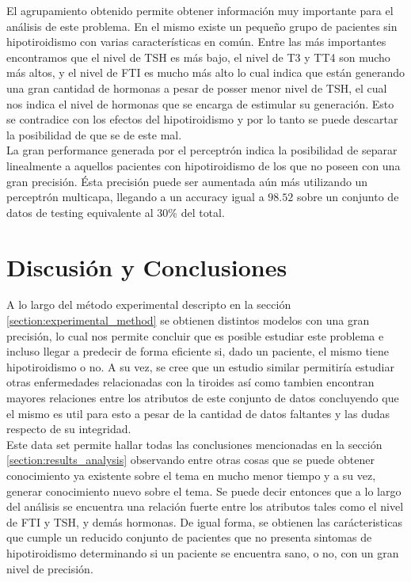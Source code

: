 \documentclass[osajnl,twocolumn,showpacs,superscriptaddress,10pt,floatfix]{revtex4-1} %
\begin{document}
El agrupamiento obtenido permite obtener información muy importante para el análisis de este problema. En el mismo existe un pequeño grupo de pacientes sin hipotiroidismo con varias características en común. Entre las más importantes encontramos que el nivel de TSH es más bajo, el nivel de T3 y TT4 son mucho más altos, y el nivel de FTI es mucho más alto lo cual indica que están generando una gran cantidad de hormonas a pesar de posser menor nivel de TSH, el cual nos indica el nivel de hormonas que se encarga de estimular su generación. Esto se contradice con los efectos del hipotiroidismo y por lo tanto se puede descartar la posibilidad de que se de este mal. \\

La gran performance generada por el perceptrón indica la posibilidad de separar linealmente a aquellos pacientes con hipotiroidismo de los que no poseen con una gran precisión. Ésta precisión puede ser aumentada aún más utilizando un perceptrón multicapa, llegando a un accuracy igual a $98.52$ sobre un conjunto de datos de testing equivalente al 30\% del total. \\


\section{Discusión y Conclusiones}

A lo largo del método experimental descripto en la sección \ref{section:experimental_method} se obtienen distintos modelos con una gran precisión, lo cual nos permite concluir que es posible estudiar este problema e incluso llegar a predecir de forma eficiente si, dado un paciente, el mismo tiene hipotiroidismo o no. A su vez, se cree que un estudio similar permitiría estudiar otras enfermedades relacionadas con la tiroides así como tambien encontran mayores relaciones entre los atributos de este conjunto de datos concluyendo que el mismo es util para esto a pesar de la cantidad de datos faltantes y las dudas respecto de su integridad. \\

Este data set permite hallar todas las conclusiones mencionadas en la sección \ref{section:results_analysis} observando entre otras cosas que se puede obtener conocimiento ya existente sobre el tema en mucho menor tiempo y a su vez, generar conocimiento nuevo sobre el tema. Se puede decir entonces que a lo largo del análisis se encuentra una relación fuerte entre los atributos tales como el nivel de FTI y TSH, y demás hormonas. De igual forma, se obtienen las carácteristicas que cumple un reducido conjunto de pacientes que no presenta sintomas de hipotiroidismo determinando si un paciente se encuentra sano, o no, con un gran nivel de precisión. \\ 
\end{document}
